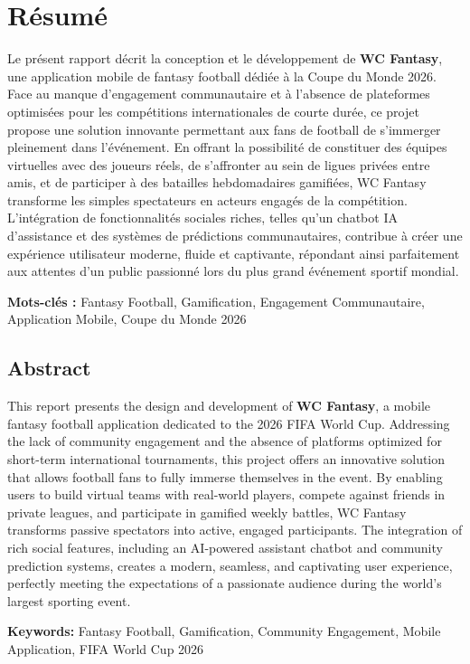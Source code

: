 
\chapter*{Résumé}

Le présent rapport décrit la conception et le développement de \textbf{WC Fantasy}, une application mobile de fantasy football dédiée à la Coupe du Monde 2026. Face au manque d'engagement communautaire et à l'absence de plateformes optimisées pour les compétitions internationales de courte durée, ce projet propose une solution innovante permettant aux fans de football de s'immerger pleinement dans l'événement. En offrant la possibilité de constituer des équipes virtuelles avec des joueurs réels, de s'affronter au sein de ligues privées entre amis, et de participer à des batailles hebdomadaires gamifiées, WC Fantasy transforme les simples spectateurs en acteurs engagés de la compétition. L'intégration de fonctionnalités sociales riches, telles qu'un chatbot IA d'assistance et des systèmes de prédictions communautaires, contribue à créer une expérience utilisateur moderne, fluide et captivante, répondant ainsi parfaitement aux attentes d'un public passionné lors du plus grand événement sportif mondial.

\vspace{1.5cm}

\noindent\textbf{Mots-clés :} Fantasy Football, Gamification, Engagement Communautaire, Application Mobile, Coupe du Monde 2026


\newpage

\section*{Abstract}

This report presents the design and development of \textbf{WC Fantasy}, a mobile fantasy football application dedicated to the 2026 FIFA World Cup. Addressing the lack of community engagement and the absence of platforms optimized for short-term international tournaments, this project offers an innovative solution that allows football fans to fully immerse themselves in the event. By enabling users to build virtual teams with real-world players, compete against friends in private leagues, and participate in gamified weekly battles, WC Fantasy transforms passive spectators into active, engaged participants. The integration of rich social features, including an AI-powered assistant chatbot and community prediction systems, creates a modern, seamless, and captivating user experience, perfectly meeting the expectations of a passionate audience during the world's largest sporting event.

\vspace{1.5cm}

\noindent\textbf{Keywords:} Fantasy Football, Gamification, Community Engagement, Mobile Application, FIFA World Cup 2026
